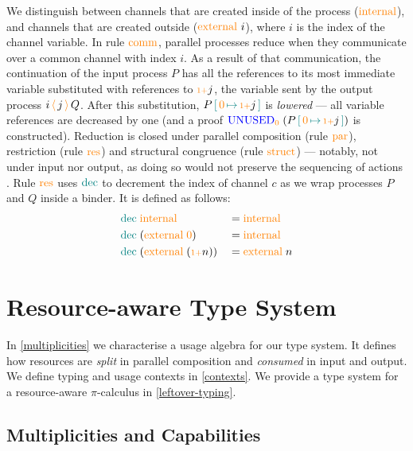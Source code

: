 \documentclass[runningheads]{llncs}
\newcommand{\picalc}{$\pi$-calculus}
\newcommand{\type}[1]{\textcolor{blue}{\operatorname{#1}}}
\newcommand{\constr}[1]{\textcolor{orange}{\operatorname{#1}}}
\newcommand{\func}[1]{\textcolor{teal}{\operatorname{#1}}}
\newcommand{\send}[2]{#1 \, \constr{\langle} \, #2 \,\constr{\rangle} \,}
\newcommand{\suc}{\constr{\scriptstyle 1+}}
\newcommand{\subst}[3]{#1 \, \func{[} \, #3 \, \func{\mapsto} \,#2 \, \func{]}}
\newcommand{\Unused}{\type{UNUSED}}
\begin{document}
\begin{nidefinition}
We distinguish between channels that are created inside of the process ($\constr{internal}$), and channels that are created outside ($\constr{external}\ i$), where $i$ is the index of the channel variable.
In rule $\constr{comm}$, parallel processes reduce when they communicate over a common channel with index ${i}$.
As a result of that communication, the continuation of the input process $P$ has all the references to its most immediate variable substituted with references to $\suc j$, the variable sent by the output process $\send{i}{j}{Q}$.
After this substitution, $\subst{P}{\suc j}{\constr{0}}$ is \emph{lowered} --- all variable references are decreased by one (and a proof $\Unused_{\constr{0}} \; (\subst{P}{\suc j}{\constr{0}})$ is constructed).
Reduction is closed under parallel composition (rule $\constr{par}$), restriction (rule $\constr{res}$) and structural congruence (rule $\constr{struct}$) 
--- notably, not under input nor output, as doing so would not preserve the sequencing of actions \cite{Sangio01}.
Rule $\constr{res}$ uses $\func{dec}$ to decrement the index of channel $c$ as we wrap processes $P$ and $Q$ inside a binder.
It is defined as follows:
\begin{equation*}
  \begin{aligned}
    & \func{dec} \; \constr{internal}                 && = \constr{internal} \\
    & \func{dec} \; (\constr{external} \; \constr{0}) && = \constr{internal} \\
    & \func{dec} \; (\constr{external} \; (\suc n))   && = \constr{external} \; n \\
  \end{aligned}
\end{equation*}
\end{nidefinition}

\section{Resource-aware Type System}
\label{type-system}

In \autoref{multiplicities} we characterise a usage algebra for our type system.
It defines how resources are \emph{split} in parallel composition and \emph{consumed} in input and output.
We define typing and usage contexts in \autoref{contexts}.
We provide a type system for a resource-aware \picalc{} in \autoref{leftover-typing}.

\subsection{Multiplicities and Capabilities}
\label{multiplicities}
\end{document}
